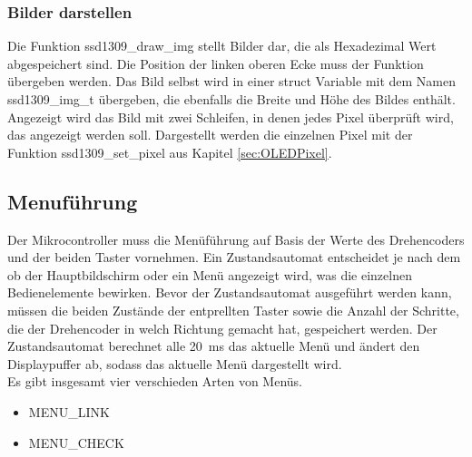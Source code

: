 \subsubsection{Bilder darstellen}\label{sec:OLEDBild}
Die Funktion \glqq ssd1309\_draw\_img\grqq{} stellt Bilder dar, die als Hexadezimal Wert abgespeichert sind. Die Position der linken oberen Ecke muss der Funktion übergeben werden. Das Bild selbst wird in einer \glqq struct\grqq{} Variable mit dem Namen \glqq ssd1309\_img\_t\grqq{} übergeben, die ebenfalls die Breite und Höhe des Bildes enthält. Angezeigt wird das Bild mit zwei Schleifen, in denen jedes Pixel überprüft wird, das angezeigt werden soll. Dargestellt werden die einzelnen Pixel mit der Funktion \glqq ssd1309\_set\_pixel\grqq{} aus Kapitel \ref{sec:OLEDPixel}.
\subsection{Menuführung}\label{sec:OLEDMenu}
Der Mikrocontroller muss die Menüführung auf Basis der Werte des Drehencoders und der beiden Taster vornehmen. Ein Zustandsautomat entscheidet je nach dem ob der Hauptbildschirm oder ein Menü angezeigt wird, was die einzelnen Bedienelemente bewirken. Bevor der Zustandsautomat ausgeführt werden kann, müssen die beiden Zustände der entprellten Taster sowie die Anzahl der Schritte, die der Drehencoder in welch Richtung gemacht hat, gespeichert werden. Der Zustandsautomat berechnet alle \SI{20}{\milli\second} das aktuelle Menü und ändert den Displaypuffer ab, sodass das aktuelle Menü dargestellt wird.\\
Es gibt insgesamt vier verschieden Arten von Menüs.
\begin{itemize}
\item MENU\_LINK
\item MENU\_CHECK
\end{itemize}





\newpage